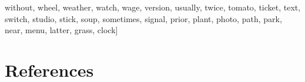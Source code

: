 \documentclass[
  12pt,
]{book}
\newenvironment{Shaded}{\begin{snugshade}}{\end{snugshade}}
\newcommand{\NormalTok}[1]{#1}
\newcommand{\StringTok}[1]{\textcolor[rgb]{0.31,0.60,0.02}{#1}}
\begin{document}
\begin{Shaded}
\begin{Highlighting}[]
                \StringTok{\textquotesingle{}without\textquotesingle{}}\NormalTok{, }\StringTok{\textquotesingle{}wheel\textquotesingle{}}\NormalTok{, }\StringTok{\textquotesingle{}weather\textquotesingle{}}\NormalTok{, }\StringTok{\textquotesingle{}watch\textquotesingle{}}\NormalTok{, }\StringTok{\textquotesingle{}wage\textquotesingle{}}\NormalTok{, }\StringTok{\textquotesingle{}version\textquotesingle{}}\NormalTok{, }\StringTok{\textquotesingle{}usually\textquotesingle{}}\NormalTok{,}
                \StringTok{\textquotesingle{}twice\textquotesingle{}}\NormalTok{, }\StringTok{\textquotesingle{}tomato\textquotesingle{}}\NormalTok{, }\StringTok{\textquotesingle{}ticket\textquotesingle{}}\NormalTok{, }\StringTok{\textquotesingle{}text\textquotesingle{}}\NormalTok{, }\StringTok{\textquotesingle{}switch\textquotesingle{}}\NormalTok{, }\StringTok{\textquotesingle{}studio\textquotesingle{}}\NormalTok{, }\StringTok{\textquotesingle{}stick\textquotesingle{}}\NormalTok{,}
                \StringTok{\textquotesingle{}soup\textquotesingle{}}\NormalTok{, }\StringTok{\textquotesingle{}sometimes\textquotesingle{}}\NormalTok{, }\StringTok{\textquotesingle{}signal\textquotesingle{}}\NormalTok{, }\StringTok{\textquotesingle{}prior\textquotesingle{}}\NormalTok{, }\StringTok{\textquotesingle{}plant\textquotesingle{}}\NormalTok{, }\StringTok{\textquotesingle{}photo\textquotesingle{}}\NormalTok{,}
                \StringTok{\textquotesingle{}path\textquotesingle{}}\NormalTok{, }\StringTok{\textquotesingle{}park\textquotesingle{}}\NormalTok{, }\StringTok{\textquotesingle{}near\textquotesingle{}}\NormalTok{, }\StringTok{\textquotesingle{}menu\textquotesingle{}}\NormalTok{, }\StringTok{\textquotesingle{}latter\textquotesingle{}}\NormalTok{, }\StringTok{\textquotesingle{}grass\textquotesingle{}}\NormalTok{, }\StringTok{\textquotesingle{}clock\textquotesingle{}}\NormalTok{]}
\end{Highlighting}
\end{Shaded}

\normalsize

\hypertarget{references}{%
\chapter*{References}\label{references}}
\end{document}

